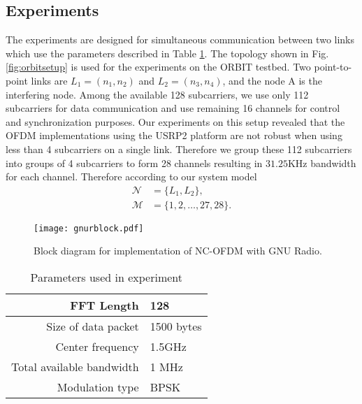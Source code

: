 \documentclass[conference]{IEEEtran}
\begin{document}
\subsection{Experiments}
The experiments are designed for simultaneous communication between two links which use the parameters described in Table \ref{table:expparam}.  The topology shown in Fig. \ref{fig:orbitsetup} is used for the experiments on the ORBIT testbed.  Two point-to-point links are $L_1 = (n_1,n_2)$ and $L_2 = (n_3,n_4)$, and the node A is the interfering node. Among the available 128 subcarriers, we use only 112 subcarriers for data communication and use remaining 16 channels for  control and synchronization  purposes. Our experiments on this setup revealed that the OFDM implementations using the USRP2 platform are not robust when using less than 4 subcarriers on a single link. Therefore we group these 112 subcarriers into groups of 4 subcarriers to form 28 channels resulting in $31.25$KHz bandwidth for each channel. Therefore according to our system model
\begin{align}
  \mathcal{N} &= \{L_1,L_2\},\, \nonumber\\
  \mathcal{M} &= \{1,2,\ldots,27,28\}. \nonumber
\end{align}


\begin{figure}[!t]
  \centering
    \texttt{[image: gnurblock.pdf]}
    \caption{Block diagram for implementation of NC-OFDM with GNU Radio.}
  \label{fig:gnurblock}
\end{figure}



\begin{table}[t!]
\centering
\caption{Parameters used in experiment}
\begin{tabular}{|r|p{}|}
  \hline
  FFT Length & 128 \\
  \hline
  Size of data packet & 1500 bytes\\
  \hline
  Center frequency & 1.5GHz \\
  \hline
  Total available bandwidth & 1 MHz\\
  \hline
  Modulation type & BPSK \\
  \hline
\end{tabular}
\label{table:expparam}
\end{table}
\end{document}
